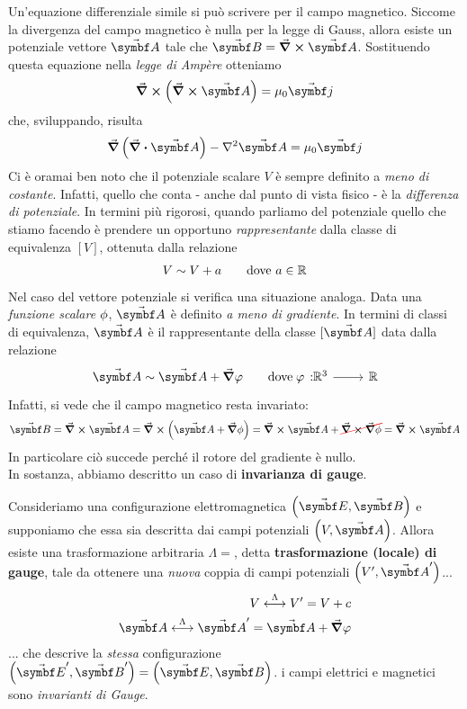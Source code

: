 Un'equazione differenziale simile si può scrivere per il campo magnetico.		Siccome la divergenza del campo magnetico è nulla per la legge di Gauss, allora esiste un potenziale vettore $\vba{A}$ tale che $\vba{B}=\curl{\vba{A}}$. Sostituendo questa equazione nella \textit{legge di Ampère} otteniamo
\begin{equation*}
	\curl\left(\curl\vba{A}\right)=\mu_0\vba j
\end{equation*}
che, sviluppando, risulta
\begin{equation*}
	\grad \left( \div{\vba{A}}\right) - \laplacian{\vba{A}}=\mu_0 \vba j
\end{equation*}
Ci è oramai ben noto che il potenziale scalare $V$ è sempre definito a \textit{meno di costante}. Infatti, quello che conta - anche dal punto di vista fisico - è la \textit{differenza di potenziale}. In termini più rigorosi, quando parliamo del potenziale quello che stiamo facendo è prendere un opportuno \textit{rappresentante} dalla classe di equivalenza $\left[V\right]$, ottenuta dalla relazione
\begin{align*}
	V\sim V+a \qquad \text{dove}\ a\in\mathbb{R}
\end{align*}
Nel caso del vettore potenziale si verifica una situazione analoga. Data una \textit{funzione scalare} $\oldphi$, $\vba{A}$ è definito \textit{a meno di gradiente}. In termini di classi di equivalenza, $\vba{A}$ è il rappresentante della classe $[\vba{A}]$ data dalla relazione
\begin{align*}
	\vba{A}\sim \vba{A}+\grad{\phi} \qquad \text{dove}\ \funz[\phi]{\realset^3}{\realset}
\end{align*}
Infatti, si vede che il campo magnetico resta invariato:
\begin{equation*}
	\vba{B}=\curl\vba{A}=\curl \left( \vba{A}+\grad\oldphi\right)= \curl \vba{A} + \Ccancel[red]{\curl\grad\oldphi}=\curl\vba{A}		
\end{equation*}
In particolare ciò succede perché il rotore del gradiente è nullo.\\
In sostanza, abbiamo descritto un caso di \textbf{invarianza di gauge}.
\begin{define}
	Consideriamo una configurazione elettromagnetica $\left(\vba{E},\vba{B}\right)$ e supponiamo che essa sia descritta dai campi potenziali $\left(V,\vba {A}\right)$. Allora esiste una trasformazione arbitraria $\Lambda=$, detta \textbf{trasformazione (locale) di gauge}, tale da ottenere una \textit{nuova} coppia di campi potenziali $\left(V',\vba {A}'\right)$...
	\begin{align*}
		V\overset{\Lambda}{\longleftrightarrow} V'=V+c\\
		\vba{A}\overset{\Lambda}{\longleftrightarrow} \vba{A}'=\vba{A}+\grad{\phi}
	\end{align*}
	... che descrive la \textit{stessa} configurazione $\left(\vba{E}',\vba{B}'\right)=\left(\vba{E},\vba{B}\right)$. i campi elettrici e magnetici sono \textit{invarianti di Gauge}.
\end{define}
